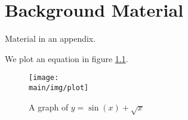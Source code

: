 \documentclass[\main/thesis.tex]{subfiles}
\begin{document}
\chapter{Background Material}

Material in an appendix.

We plot an equation in figure \ref{fig:plot}.

\begin{figure}
    \centering
    \texttt{[image: \\main/img/plot]}
    \caption[A supporting figure] {A graph of $y = \sin(x) + \sqrt{x}$}
    \label{fig:plot}
\end{figure}
\end{document}
